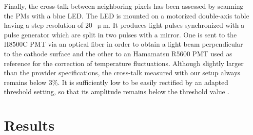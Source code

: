 \documentclass[a4paper,11pt]{article}
\begin{document}
Finally, the cross-talk between neighboring pixels has been assessed by scanning the PMs with a blue LED. The LED is mounted on a motorized double-axis table having a step resolution of 20~$\upmu$m. It produces light pulses synchronized with a pulse generator which are split in two pulses with a mirror. One is sent to the H8500C PMT via an optical fiber in order to obtain a light beam perpendicular to the cathode surface and the other to an Hamamatsu R5600 PMT used as reference for the correction of temperature fluctuations. Although slightly larger than the provider specifications, the cross-talk measured with our setup always remains below 3\%. It is sufficiently low to be easily rectified by an adapted threshold setting, so that its amplitude remains below the threshold value \cite{FontanaPhD}.

\section{Results}
\label{Results}
\end{document}
